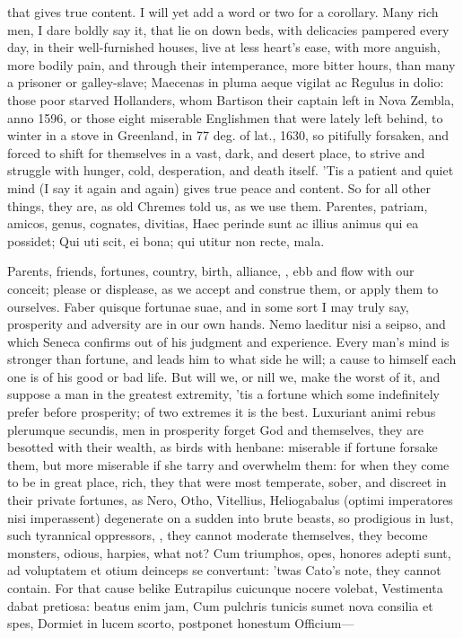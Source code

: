 {that gives true content. I will yet add a word or two for a corollary.
Many rich men, I dare boldly say it, that lie on down beds, with
delicacies pampered every day, in their well-furnished houses, live at
less heart's ease, with more anguish, more bodily pain, and through
their intemperance, more bitter hours, than many a prisoner or
galley-slave; Maecenas in pluma aeque vigilat ac Regulus in
dolio: those poor starved Hollanders, whom Bartison their captain
left in Nova Zembla, anno 1596, or those eight miserable
Englishmen that were lately left behind, to winter in a stove in
Greenland, in 77 deg. of lat., 1630, so pitifully forsaken, and forced
to shift for themselves in a vast, dark, and desert place, to strive
and struggle with hunger, cold, desperation, and death itself. 'Tis a
patient and quiet mind (I say it again and again) gives true peace and
content. So for all other things, they are, as old Chremes told
us, as we use them.
Parentes, patriam, amicos, genus, cognates, divitias,
Haec perinde sunt ac illius animus qui ea possidet;
Qui uti scit, ei bona; qui utitur non recte, mala.

Parents, friends, fortunes, country, birth, alliance, \etc{}, ebb and flow
with our conceit; please or displease, as we accept and construe them,
or apply them to ourselves. Faber quisque fortunae suae, and in some
sort I may truly say, prosperity and adversity are in our own hands.
Nemo laeditur nisi a seipso, and which Seneca confirms out of his
judgment and experience. Every man's mind is stronger than
fortune, and leads him to what side he will; a cause to himself each
one is of his good or bad life. But will we, or nill we, make the worst
of it, and suppose a man in the greatest extremity, 'tis a fortune
which some indefinitely prefer before prosperity; of two extremes it is
the best. Luxuriant animi rebus plerumque secundis, men in
prosperity forget God and themselves, they are besotted with
their wealth, as birds with henbane:  miserable if fortune
forsake them, but more miserable if she tarry and overwhelm them: for
when they come to be in great place, rich, they that were most
temperate, sober, and discreet in their private fortunes, as Nero,
Otho, Vitellius, Heliogabalus (optimi imperatores nisi imperassent)
degenerate on a sudden into brute beasts, so prodigious in lust, such
tyrannical oppressors, \etc{}, they cannot moderate themselves, they
become monsters, odious, harpies, what not? Cum triumphos, opes,
honores adepti sunt, ad voluptatem et otium deinceps se convertunt:
'twas Cato's note, they cannot contain. For that cause belike
Eutrapilus cuicunque nocere volebat,
Vestimenta dabat pretiosa: beatus enim jam,
Cum pulchris tunicis sumet nova consilia et spes,
Dormiet in lucem scorto, postponet honestum
Officium---

}

